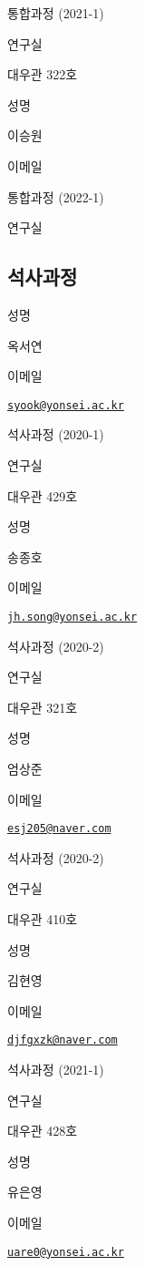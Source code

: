 \documentclass[
]{book}
\begin{document}
통합과정 (2021-1)

연구실

대우관 322호

성명

이승원

이메일

통합과정 (2022-1)

연구실

\hypertarget{uxc11duxc0acuxacfcuxc815}{%
\subsection*{석사과정}\label{uxc11duxc0acuxacfcuxc815}}

성명

옥서연

이메일

\href{mailto:syook@yonsei.ac.kr}{\nolinkurl{syook@yonsei.ac.kr}}

석사과정 (2020-1)

연구실

대우관 429호

성명

송종호

이메일

\href{mailto:jh.song@yonsei.ac.kr}{\nolinkurl{jh.song@yonsei.ac.kr}}

석사과정 (2020-2)

연구실

대우관 321호

성명

엄상준

이메일

\href{mailto:esj205@naver.com}{\nolinkurl{esj205@naver.com}}

석사과정 (2020-2)

연구실

대우관 410호

성명

김현영

이메일

\href{mailto:djfgxzk@naver.com}{\nolinkurl{djfgxzk@naver.com}}

석사과정 (2021-1)

연구실

대우관 428호

성명

유은영

이메일

\href{mailto:uare0@yonsei.ac.kr}{\nolinkurl{uare0@yonsei.ac.kr}}
\end{document}

